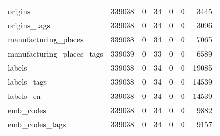 \begin{tabular}{lrrrrrr}
origins                                    &                                        339038 &                                         0 &                                            34 &                                         0 &                      0 &             3445 \\
origins\_tags                               &                                        339038 &                                         0 &                                            34 &                                         0 &                      0 &             3096 \\
manufacturing\_places                       &                                        339038 &                                         0 &                                            34 &                                         0 &                      0 &             7065 \\
manufacturing\_places\_tags                  &                                        339039 &                                         0 &                                            33 &                                         0 &                      0 &             6589 \\
labels                                     &                                        339038 &                                         0 &                                            34 &                                         0 &                      0 &            19085 \\
labels\_tags                                &                                        339038 &                                         0 &                                            34 &                                         0 &                      0 &            14539 \\
labels\_en                                  &                                        339038 &                                         0 &                                            34 &                                         0 &                      0 &            14539 \\
emb\_codes                                  &                                        339038 &                                         0 &                                            34 &                                         0 &                      0 &             9882 \\
emb\_codes\_tags                             &                                        339038 &                                         0 &                                            34 &                                         0 &                      0 &             9157 \\

\end{tabular}
